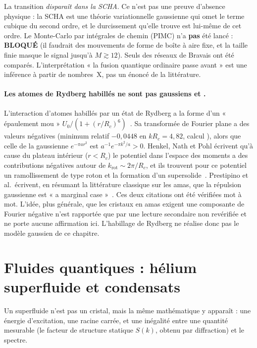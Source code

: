 \begin{warnbox}
La transition \emph{disparaît dans la SCHA}. Ce n'est pas une preuve d'absence physique : la SCHA est une théorie
variationnelle gaussienne qui omet le terme cubique du second ordre, et le durcissement qu'elle trouve est lui-même de cet
ordre. Le Monte-Carlo par intégrales de chemin (PIMC) n'a \textbf{pas} été lancé : \textbf{BLOQUÉ} (il faudrait des
mouvements de forme de boîte à aire fixe, et la taille finie masque le signal jusqu'à $M\gtrsim12$). Seuls des réseaux de
Bravais ont été comparés. L'interprétation « la fusion quantique ordinaire passe avant » est une inférence à partir de
nombres~X, pas un énoncé de la littérature.
\end{warnbox}

\paragraph{Les atomes de Rydberg habillés ne sont pas gaussiens \tierC{} et \tierX.} L'interaction d'atomes habillés par
un état de Rydberg a la forme d'un « épaulement mou » $U_0/(1+(r/R_c)^6)$~\cite{ch3-zeiher,ch3-henkel}. Sa transformée de
Fourier plane a des valeurs négatives (minimum relatif $-0{,}0448$ en $kR_c=4{,}82$, calcul \tierX), alors que celle de la
gaussienne $e^{-\pi ar^2}$ est $a^{-1}e^{-\pi k^2/a}>0$. Henkel, Nath et Pohl écrivent qu'à cause du plateau intérieur
($r<R_c$) le potentiel dans l'espace des moments a des contributions négatives autour de $k_{\mathrm{rot}}\sim2\pi/R_c$, et
ils trouvent pour ce potentiel un ramollissement de type roton et la formation d'un supersolide~\cite{ch3-henkel}.
Prestipino et al.\ écrivent, en résumant la littérature classique sur les amas, que la répulsion gaussienne est « a
marginal case »~\cite{ch3-prestipino}. Ces deux citations ont été vérifiées mot à mot. L'idée, plus générale, que les
cristaux en amas exigent une composante de Fourier négative n'est rapportée que par une lecture secondaire non revérifiée
et ne porte aucune affirmation ici. L'habillage de Rydberg ne réalise donc pas le modèle gaussien de ce chapitre.

\section{Fluides quantiques : hélium superfluide et condensats}\label{ch3:sec:fluides}
Un superfluide n'est pas un cristal, mais la même mathématique y apparaît : une énergie d'excitation, une racine carrée,
et une inégalité entre une quantité mesurable (le facteur de structure statique $S(k)$, obtenu par diffraction) et le
spectre.

